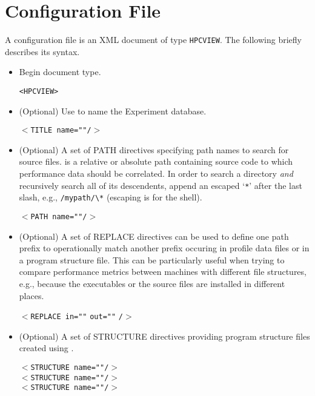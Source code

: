 \documentclass[english]{article}
\begin{document}
\section{Configuration File}

A  configuration file is an XML document of type \texttt{HPCVIEW}.
The following briefly describes its syntax.

\begin{itemize}

\item Begin document type.
  \begin{itemize}
  \verb+<HPCVIEW>+
  \end{itemize}

\item (Optional) Use  to name the Experiment database.
  \begin{itemize}
  \texttt{$<$TITLE name="}\texttt{"/$>$}
  \end{itemize}

\item (Optional) A set of PATH directives specifying path names to search for source files.
 is a relative or absolute path containing source code to which performance data should be correlated.
In order to search a directory \emph{and} recursively search all of its descendents, append an escaped `\texttt{*}' after the last slash, e.g., \verb+/mypath/\*+ (escaping is for the shell).
  \begin{itemize}
  \texttt{$<$PATH name="}\texttt{"/$>$}
  \end{itemize}

\item (Optional) A set of REPLACE directives can be used to define one path prefix to operationally match another prefix occuring in profile data files or in a program structure file. This can be particularly useful when trying to compare performance metrics between machines with different file structures, e.g., because the executables or the source files are installed in different places.
  \begin{itemize}
  \texttt{$<$REPLACE in="}\texttt{"}
    \texttt{out="}\texttt{"}
      \texttt{/$>$}
  \end{itemize}

\item (Optional) A set of STRUCTURE directives providing program structure files created using .
  \begin{itemize}
  \texttt{$<$STRUCTURE name="}\texttt{"/$>$}\\
  \texttt{$<$STRUCTURE name="}\texttt{"/$>$}\\
  \texttt{$<$STRUCTURE name="}\texttt{"/$>$}\\
  \end{itemize}


\end{itemize}
\end{document}
